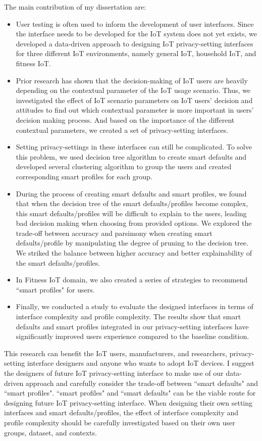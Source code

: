 The main contribution of my dissertation are:
\begin{itemize}
	\item User testing is often used to inform the development of user interfaces. Since the interface needs to be developed for the IoT system does not yet exists, we developed a data-driven approach to designing IoT privacy-setting interfaces for three different IoT environments, namely general IoT, household IoT, and fitness IoT.
	\item Prior research has shown that the decision-making of IoT users are heavily depending on the contextual parameter of the IoT usage scenario. Thus, we investigated the effect of IoT scenario parameters on IoT users’ decision and attitudes to find out which contextual parameter is more important in users’ decision making process. And based on the importance of the different contextual parameters, we created a set of privacy-setting interfaces.
	\item Setting privacy-settings in these interfaces can still be complicated. To solve this problem, we used decision tree algorithm to create smart defaults and developed several clustering algorithm to group the users and created corresponding smart profiles for each group.
	\item During the process of creating smart defaults and smart profiles, we found that when the decision tree of the smart defaults/profiles become complex, this smart defaults/profiles will be difficult to explain to the users, leading bad decision making when choosing from provided options. We explored the trade-off between accuracy and parsimony when creating smart defaults/profile by manipulating the degree of pruning to the decision tree. We striked the balance between higher accuracy  and better explainability of the smart defaults/profiles.
	\item In Fitness IoT domain, we also created a series of strategies to recommend ``smart profiles" for users.
	\item Finally, we conducted a study to evaluate the designed interfaces in terms of interface complexity and profile complexity. The results show that smart defaults and smart profiles integrated in our privacy-setting interfaces have significantly improved users experience compared to the baseline condition.
\end{itemize}

This research can benefit the IoT users, manufacturers, and researchers, privacy-setting interface designers and anyone who wants to adopt IoT devices.
I suggest the designers of future IoT privacy-setting interface to make use of our data-driven approach and carefully consider the trade-off between ``smart defaults" and ``smart profiles". ``smart profiles" and ``smart defaults" can be the viable route for designing future IoT privacy-setting interface. When designing their own setting interfaces and smart defaults/profiles, the effect of interface complexity and profile complexity should be carefully investigated based on their own user groups, dataset, and contexts.


